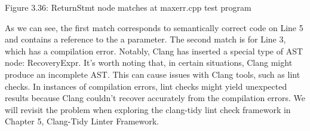 \begin{center}
Figure 3.36: ReturnStmt node matches at maxerr.cpp test program
\end{center}

As we can see, the first match corresponds to semantically correct code on Line 5 and contains a reference to the a parameter. The second match is for Line 3, which has a compilation error. Notably, Clang has inserted a special type of AST node: RecoveryExpr. It’s worth noting that, in certain situations, Clang might produce an incomplete AST. This can cause issues with Clang tools, such as lint checks. In instances of compilation errors, lint checks might yield unexpected results because Clang couldn’t recover accurately from the compilation errors. We will revisit the problem when exploring the clang-tidy lint check framework in Chapter 5, Clang-Tidy Linter Framework.




















































































